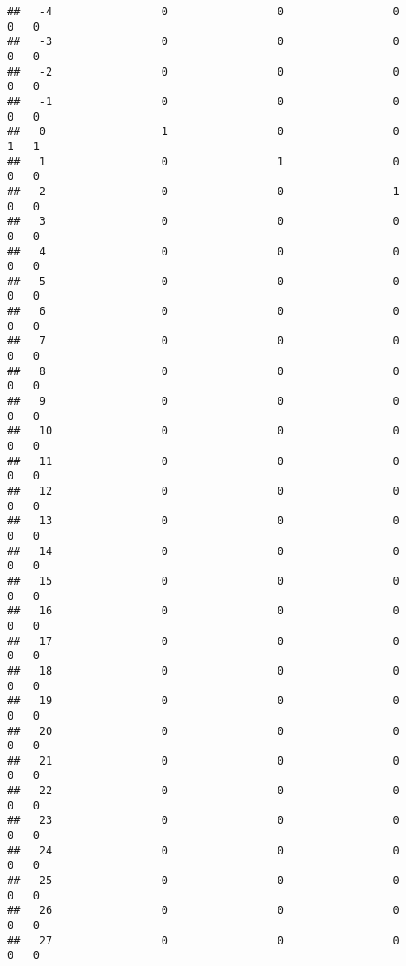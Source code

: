 \documentclass[]{article}
\begin{document}
\begin{verbatim}
##   -4                 0                 0                 0                0   0
##   -3                 0                 0                 0                0   0
##   -2                 0                 0                 0                0   0
##   -1                 0                 0                 0                0   0
##   0                  1                 0                 0                1   1
##   1                  0                 1                 0                0   0
##   2                  0                 0                 1                0   0
##   3                  0                 0                 0                0   0
##   4                  0                 0                 0                0   0
##   5                  0                 0                 0                0   0
##   6                  0                 0                 0                0   0
##   7                  0                 0                 0                0   0
##   8                  0                 0                 0                0   0
##   9                  0                 0                 0                0   0
##   10                 0                 0                 0                0   0
##   11                 0                 0                 0                0   0
##   12                 0                 0                 0                0   0
##   13                 0                 0                 0                0   0
##   14                 0                 0                 0                0   0
##   15                 0                 0                 0                0   0
##   16                 0                 0                 0                0   0
##   17                 0                 0                 0                0   0
##   18                 0                 0                 0                0   0
##   19                 0                 0                 0                0   0
##   20                 0                 0                 0                0   0
##   21                 0                 0                 0                0   0
##   22                 0                 0                 0                0   0
##   23                 0                 0                 0                0   0
##   24                 0                 0                 0                0   0
##   25                 0                 0                 0                0   0
##   26                 0                 0                 0                0   0
##   27                 0                 0                 0                0   0

\end{verbatim}
\end{document}
